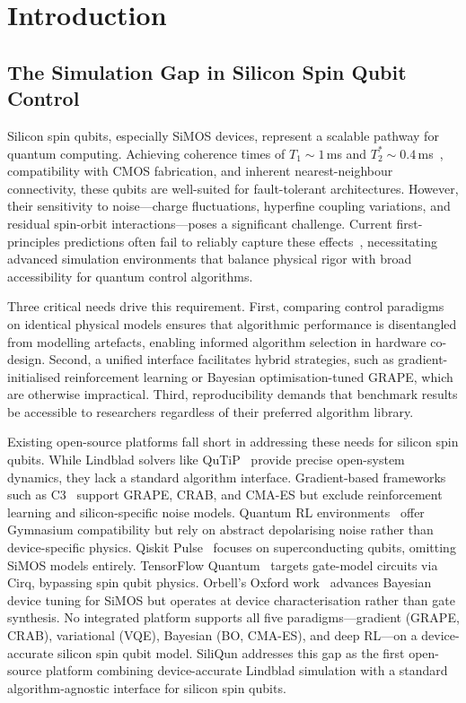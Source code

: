 \section{Introduction}
\label{sec:introduction}

\subsection{The Simulation Gap in Silicon Spin Qubit Control}
\label{subsec:simulation_gap}

Silicon spin qubits, especially SiMOS devices, represent a scalable pathway for quantum computing. Achieving coherence times of $T_1 \sim 1$\,ms and $T_2^* \sim 0.4$\,ms~\cite{Xue2022,Noiri2022,Philips2022}, compatibility with CMOS fabrication, and inherent nearest-neighbour connectivity, these qubits are well-suited for fault-tolerant architectures. However, their sensitivity to noise—charge fluctuations, hyperfine coupling variations, and residual spin-orbit interactions—poses a significant challenge. Current first-principles predictions often fail to reliably capture these effects~\cite{Veldhorst2015,Fogarty2018}, necessitating advanced simulation environments that balance physical rigor with broad accessibility for quantum control algorithms.

Three critical needs drive this requirement. First, comparing control paradigms on identical physical models ensures that algorithmic performance is disentangled from modelling artefacts, enabling informed algorithm selection in hardware co-design. Second, a unified interface facilitates hybrid strategies, such as gradient-initialised reinforcement learning or Bayesian optimisation-tuned GRAPE, which are otherwise impractical. Third, reproducibility demands that benchmark results be accessible to researchers regardless of their preferred algorithm library.

Existing open-source platforms fall short in addressing these needs for silicon spin qubits. While Lindblad solvers like QuTiP~\cite{Johansson2012,Johansson2013} provide precise open-system dynamics, they lack a standard algorithm interface. Gradient-based frameworks such as C3~\cite{Wittler2021} support GRAPE, CRAB, and CMA-ES but exclude reinforcement learning and silicon-specific noise models. Quantum RL environments~\cite{VanDerLinde2023,QiskitGym2024} offer Gymnasium compatibility but rely on abstract depolarising noise rather than device-specific physics. Qiskit Pulse~\cite{Alexander2020} focuses on superconducting qubits, omitting SiMOS models entirely. TensorFlow Quantum~\cite{Broughton2020} targets gate-model circuits via Cirq, bypassing spin qubit physics. Orbell's Oxford work~\cite{Orbell2024} advances Bayesian device tuning for SiMOS but operates at device characterisation rather than gate synthesis. No integrated platform supports all five paradigms—gradient (GRAPE, CRAB), variational (VQE), Bayesian (BO, CMA-ES), and deep RL—on a device-accurate silicon spin qubit model. SiliQun addresses this gap as the first open-source platform combining device-accurate Lindblad simulation with a standard algorithm-agnostic interface for silicon spin qubits.

